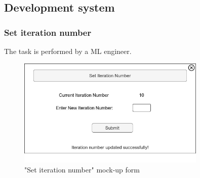 \subsection{Development system}

\subsubsection{Set iteration number}

The task is performed by a ML engineer.

\begin{figure}[H]
\centering
\includegraphics[width=0.8\textwidth]{figures/set_iteration_number.png}
\caption{"Set iteration number" mock-up form}
\end{figure}

